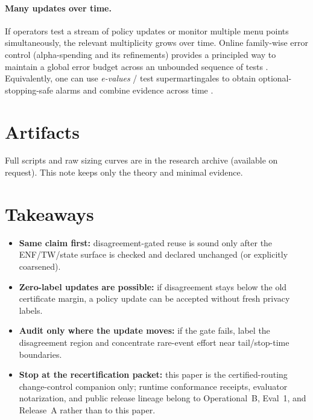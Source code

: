 \documentclass[11pt]{article}
\begin{document}
\paragraph{Many updates over time.}
If operators test a stream of policy updates or monitor multiple menu points simultaneously, the relevant multiplicity grows over time.
Online family-wise error control (alpha-spending and its refinements) provides a principled way to maintain a global error budget across an unbounded sequence of tests \cite{tian2021onlinefwer}.
Equivalently, one can use \emph{e-values} / test supermartingales to obtain optional-stopping-safe alarms and combine evidence across time \cite{ramdas2025evals,vovk2021evals,hartog2025efwer}.


\section*{Artifacts}
Full scripts and raw sizing curves are in the research archive (available on request). This note keeps only the theory and minimal evidence.

\section{Takeaways}
\begin{itemize}[leftmargin=*]
\item \textbf{Same claim first:} disagreement-gated reuse is sound only after the ENF/TW/state surface is checked and declared unchanged (or explicitly coarsened).
\item \textbf{Zero-label updates are possible:} if disagreement stays below the old certificate margin, a policy update can be accepted without fresh privacy labels.
\item \textbf{Audit only where the update moves:} if the gate fails, label the disagreement region and concentrate rare-event effort near tail/stop-time boundaries.
\item \textbf{Stop at the recertification packet:} this paper is the certified-routing change-control companion only; runtime conformance receipts, evaluator notarization, and public release lineage belong to Operational~B, Eval~1, and Release~A rather than to this paper.
\end{itemize}
\end{document}
